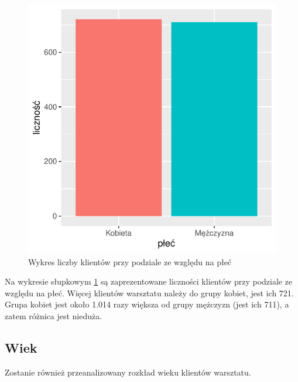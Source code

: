 \documentclass{article}\usepackage[]{graphicx}\usepackage[]{xcolor}
\makeatletter
\def\maxwidth{ %
  \ifdim\Gin@nat@width>\linewidth
    \linewidth
  \else
    \Gin@nat@width
  \fi
}
\newenvironment{knitrout}{}{} %
\makeatother
\begin{document}
\begin{knitrout}
\color{fgcolor}\begin{figure}[H]

{\centering \includegraphics[width=\maxwidth]{figure/fig_plec-1} 

}

\caption[Wykres liczby klientów przy podziale ze względu na płeć]{Wykres liczby klientów przy podziale ze względu na płeć}\label{fig:fig_plec}
\end{figure}

\end{knitrout}

Na wykresie słupkowym \ref{fig:fig_plec} są zaprezentowane liczności klientów przy podziale ze względu na płeć. Więcej klientów warsztatu należy do grupy kobiet, jest ich 721. Grupa kobiet jest około 1.014
razy większa od grupy mężczyzn (jest ich 711), a zatem różnica jest nieduża.

\subsection{Wiek}

Zostanie również przeanalizowany rozkład wieku klientów warsztatu.
\end{document}
